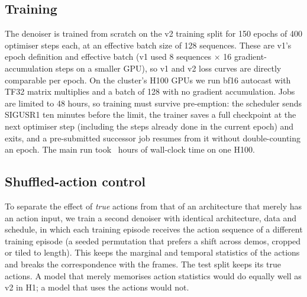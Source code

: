 \subsection{Training}
The denoiser is trained from scratch on the v2 training split for 150 epochs of 400 optimiser steps each, at an effective batch size of 128 sequences.
These are v1's epoch definition and effective batch (v1 used 8 sequences $\times$ 16 gradient-accumulation steps on a smaller GPU), so v1 and v2 loss curves are directly comparable per epoch.
On the cluster's H100 GPUs we run bf16 autocast with TF32 matrix multiplies and a batch of 128 with no gradient accumulation.
Jobs are limited to 48 hours, so training must survive pre-emption: the scheduler sends SIGUSR1 ten minutes before the limit, the trainer saves a full checkpoint at the next optimiser step (including the steps already done in the current epoch) and exits, and a pre-submitted successor job resumes from it without double-counting an epoch.
The main run took \TBDtrainwall\ hours of wall-clock time on one H100.

\subsection{Shuffled-action control}
To separate the effect of \emph{true} actions from that of an architecture that merely has an action input, we train a second denoiser with identical architecture, data and schedule, in which each training episode receives the action sequence of a different training episode (a seeded permutation that prefers a shift across demos, cropped or tiled to length).
This keeps the marginal and temporal statistics of the actions and breaks the correspondence with the frames.
The test split keeps its true actions.
A model that merely memorises action statistics would do equally well as v2 in H1; a model that uses the actions would not.
